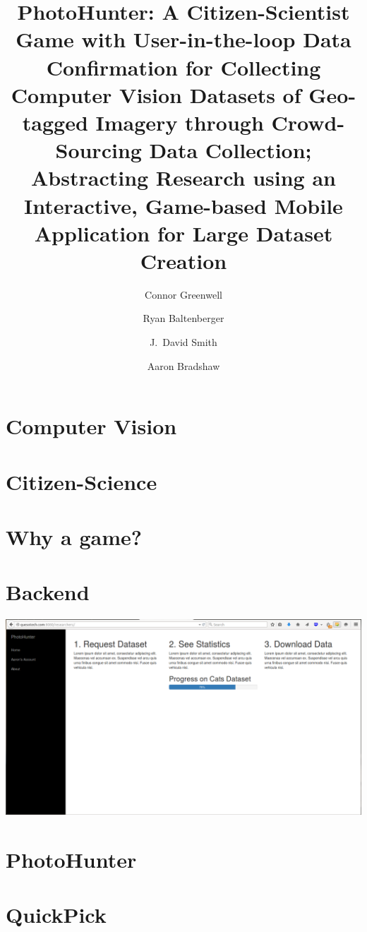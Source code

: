 \documentclass[aspectratio=169]{beamer}
\title[PhotoHunter]{PhotoHunter: A Citizen-Scientist Game with User-in-the-loop 
  Data Confirmation for Collecting Computer Vision Datasets of 
  Geo-tagged Imagery through Crowd-Sourcing Data Collection; 
  Abstracting Research using an Interactive, Game-based Mobile 
  Application for Large Dataset Creation}
\author[]{Connor Greenwell \and Ryan Baltenberger 
 \and J.\ David Smith \and Aaron Bradshaw}
\begin{document}
\maketitle

\section{Computer Vision}

\section{Citizen-Science}

\section{Why a game?}

\section{Backend}

\begin{frame}
  \includegraphics[width=\columnwidth]{researchers}
\end{frame}

\section{PhotoHunter}

\section{QuickPick}
\end{document}
